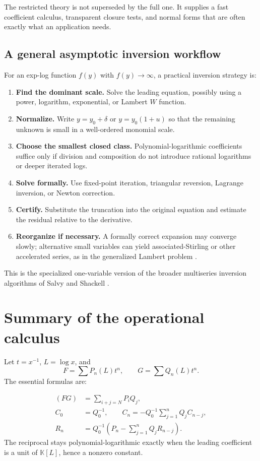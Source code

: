 \documentclass[11pt]{article}
\theoremstyle{pltheorem}
\newcommand{\K}{\mathbb K}
\begin{document}
The restricted theory is not superseded by the full one.  It supplies a fast coefficient calculus, transparent closure tests, and normal forms that are often exactly what an application needs.

\subsection{A general asymptotic inversion workflow}

For an exp-log function \(f(y)\) with \(f(y)\to\infty\), a practical inversion strategy is:
\begin{enumerate}
\item \textbf{Find the dominant scale.}  Solve the leading equation, possibly using a power, logarithm, exponential, or Lambert \(W\) function.
\item \textbf{Normalize.}  Write \(y=y_0+\delta\) or \(y=y_0(1+u)\) so that the remaining unknown is small in a well-ordered monomial scale.
\item \textbf{Choose the smallest closed class.}  Polynomial-logarithmic coefficients suffice only if division and composition do not introduce rational logarithms or deeper iterated logs.
\item \textbf{Solve formally.}  Use fixed-point iteration, triangular reversion, Lagrange inversion, or Newton correction.
\item \textbf{Certify.}  Substitute the truncation into the original equation and estimate the residual relative to the derivative.
\item \textbf{Reorganize if necessary.}  A formally correct expansion may converge slowly; alternative small variables can yield associated-Stirling or other accelerated series, as in the generalized Lambert problem \cite{jeffrey-et-al-1995}.
\end{enumerate}
This is the specialized one-variable version of the broader multiseries inversion algorithms of Salvy and Shackell \cite{salvy-shackell-1999}.

\section{Summary of the operational calculus}
\label{sec:summary}

Let \(t=x^{-1}\), \(L=\log x\), and
\[
 F=\sum P_n(L)t^n,
 \qquad
 G=\sum Q_n(L)t^n.
\]
The essential formulas are:

\begin{keybox}
\begin{align*}
 [t^N](FG)&=\sum_{i+j=N}P_iQ_j,\\
 C_0&=Q_0^{-1},\qquad
 C_n=-Q_0^{-1}\sum_{j=1}^nQ_jC_{n-j},\\
 R_n&=Q_0^{-1}\left(P_n-\sum_{j=1}^nQ_jR_{n-j}\right).
\end{align*}
The reciprocal stays polynomial-logarithmic exactly when the leading coefficient is a unit of \(\K[L]\), hence a nonzero constant.
\end{keybox}
\end{document}
